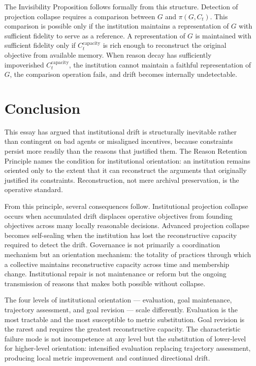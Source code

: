 The Invisibility Proposition follows formally from this structure. Detection
of projection collapse requires a comparison between $G$ and $\pi(G, C_t)$.
This comparison is possible only if the institution maintains a representation
of $G$ with sufficient fidelity to serve as a reference. A representation
of $G$ is maintained with sufficient fidelity only if $C_t^{\text{capacity}}$
is rich enough to reconstruct the original objective from available memory.
When reason decay has sufficiently impoverished $C_t^{\text{capacity}}$,
the institution cannot maintain a faithful representation of $G$, the
comparison operation fails, and drift becomes internally undetectable.

\section*{Conclusion}

This essay has argued that institutional drift is structurally inevitable
rather than contingent on bad agents or misaligned incentives, because
constraints persist more readily than the reasons that justified them.
The Reason Retention Principle names the condition for institutional
orientation: an institution remains oriented only to the extent that it
can reconstruct the arguments that originally justified its constraints.
Reconstruction, not mere archival preservation, is the operative standard.

From this principle, several consequences follow. Institutional projection
collapse occurs when accumulated drift displaces operative objectives from
founding objectives across many locally reasonable decisions. Advanced
projection collapse becomes self-sealing when the institution has lost
the reconstructive capacity required to detect the drift. Governance is
not primarily a coordination mechanism but an orientation mechanism: the
totality of practices through which a collective maintains reconstructive
capacity across time and membership change. Institutional repair is not
maintenance or reform but the ongoing transmission of reasons that makes
both possible without collapse.

The four levels of institutional orientation --- evaluation, goal maintenance,
trajectory assessment, and goal revision --- scale differently. Evaluation
is the most tractable and the most susceptible to metric substitution.
Goal revision is the rarest and requires the greatest reconstructive capacity.
The characteristic failure mode is not incompetence at any level but the
substitution of lower-level for higher-level orientation: intensified evaluation
replacing trajectory assessment, producing local metric improvement and
continued directional drift.

